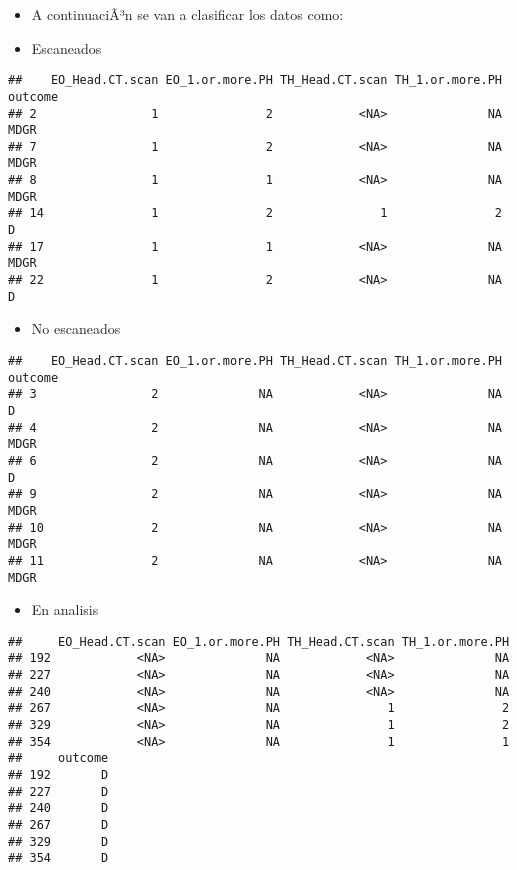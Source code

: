 \documentclass[]{article}
\providecommand{\tightlist}{%
  \setlength{\itemsep}{0pt}\setlength{\parskip}{0pt}}
\begin{document}
\begin{itemize}
\item
  A continuaciÃ³n se van a clasificar los datos como:
\item
  Escaneados
\end{itemize}

\begin{verbatim}
##    EO_Head.CT.scan EO_1.or.more.PH TH_Head.CT.scan TH_1.or.more.PH outcome
## 2                1               2            <NA>              NA    MDGR
## 7                1               2            <NA>              NA    MDGR
## 8                1               1            <NA>              NA    MDGR
## 14               1               2               1               2       D
## 17               1               1            <NA>              NA    MDGR
## 22               1               2            <NA>              NA       D
\end{verbatim}

\begin{itemize}
\tightlist
\item
  No escaneados
\end{itemize}

\begin{verbatim}
##    EO_Head.CT.scan EO_1.or.more.PH TH_Head.CT.scan TH_1.or.more.PH outcome
## 3                2              NA            <NA>              NA       D
## 4                2              NA            <NA>              NA    MDGR
## 6                2              NA            <NA>              NA       D
## 9                2              NA            <NA>              NA    MDGR
## 10               2              NA            <NA>              NA    MDGR
## 11               2              NA            <NA>              NA    MDGR
\end{verbatim}

\begin{itemize}
\tightlist
\item
  En analisis
\end{itemize}

\begin{verbatim}
##     EO_Head.CT.scan EO_1.or.more.PH TH_Head.CT.scan TH_1.or.more.PH
## 192            <NA>              NA            <NA>              NA
## 227            <NA>              NA            <NA>              NA
## 240            <NA>              NA            <NA>              NA
## 267            <NA>              NA               1               2
## 329            <NA>              NA               1               2
## 354            <NA>              NA               1               1
##     outcome
## 192       D
## 227       D
## 240       D
## 267       D
## 329       D
## 354       D
\end{verbatim}
\end{document}
